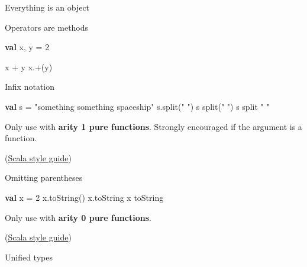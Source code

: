 \documentclass[ignorenonframetext,]{beamer}
\newenvironment{Shaded}{\begin{snugshade}}{\end{snugshade}}
\newcommand{\KeywordTok}[1]{\textcolor[rgb]{0.13,0.29,0.53}{\textbf{#1}}}
\newcommand{\DecValTok}[1]{\textcolor[rgb]{0.00,0.00,0.81}{#1}}
\newcommand{\StringTok}[1]{\textcolor[rgb]{0.31,0.60,0.02}{#1}}
\newcommand{\FunctionTok}[1]{\textcolor[rgb]{0.00,0.00,0.00}{#1}}
\newcommand{\NormalTok}[1]{#1}
\begin{document}
\begin{frame}[fragile]
\begin{block}{Everything is an object}
\end{block}

\begin{block}{Operators are methods}

\begin{Shaded}
\begin{Highlighting}[]
\KeywordTok{val}\NormalTok{ x, y = }\DecValTok{2}

\NormalTok{x + y}
\NormalTok{x.+(y)}
\end{Highlighting}
\end{Shaded}

\end{block}

\begin{block}{Infix notation}

\begin{Shaded}
\begin{Highlighting}[]
\KeywordTok{val}\NormalTok{ s = }\StringTok{"something something spaceship"}
\NormalTok{s.}\FunctionTok{split}\NormalTok{(}\StringTok{" "}\NormalTok{)}
\NormalTok{s }\FunctionTok{split}\NormalTok{(}\StringTok{" "}\NormalTok{)}
\NormalTok{s split }\StringTok{" "}
\end{Highlighting}
\end{Shaded}

Only use with \textbf{arity 1 pure functions}. Strongly encouraged if
the argument is a function.

(\href{http://docs.scala-lang.org/style/method-invocation.html}{Scala
style guide})

\end{block}

\begin{block}{Omitting parentheses}

\begin{Shaded}
\begin{Highlighting}[]
\KeywordTok{val}\NormalTok{ x = }\DecValTok{2}
\NormalTok{x.}\FunctionTok{toString}\NormalTok{()}
\NormalTok{x.}\FunctionTok{toString}
\NormalTok{x toString}
\end{Highlighting}
\end{Shaded}

Only use with \textbf{arity 0 pure functions}.

(\href{http://docs.scala-lang.org/style/method-invocation.html}{Scala
style guide})

\end{block}

\begin{block}{Unified types}


\end{block}
\end{frame}
\end{document}
